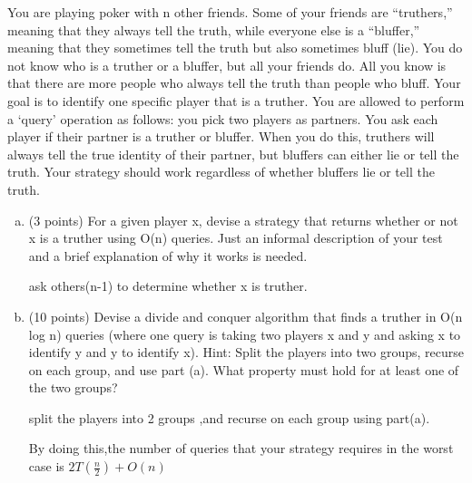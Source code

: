 \documentclass[11pt]{article}
\begin{document}
\begin{subparts}
    \item You are playing poker with n other friends. Some of your friends are “truthers,” meaning that they always tell the truth, while everyone else is a “bluffer,” meaning that they sometimes tell the truth but also sometimes bluff (lie). You do not know who is a truther or a bluffer, but all your friends do. All you know is that there are more people who always tell the truth than people who bluff. Your goal is to identify one specific player that is a truther. You are allowed to perform a ‘query’ operation as follows: you pick two players as partners. You ask each player if their partner is a truther or bluffer. When you do this, truthers will always tell the true identity of their partner, but bluffers can either lie or tell the truth. Your strategy should work regardless of whether bluffers lie or tell the truth. \par
    \begin{enumerate}[(a)]
            \item(3 points) For a given player x, devise a strategy that returns whether or not x is a truther using O(n) queries. Just an informal description of your test and a brief explanation of why it works is needed.\par
            \begin{solution}
                ask others(n-1) to determine whether x is truther.
            \end{solution}

            \item(10 points) Devise a divide and conquer algorithm that finds a truther in O(n log n) queries (where one query is taking two players x and y and asking x to identify y and y to identify x). Hint: Split the players into two groups, recurse on each group, and use part (a). What property must hold for at least one of the two groups? \par
            \begin{solution}
                split the players into 2 groups ,and recurse on each group using part(a).  \par
                By doing this,the number of queries that your strategy requires in the worst case is $2T(\frac{n}{2})+O(n)$
            \end{solution}
    \end{enumerate}

\end{subparts}
\end{document}
